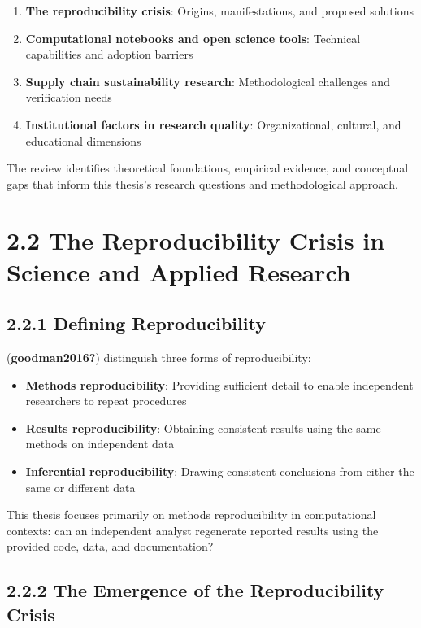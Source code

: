\documentclass[
  oneside,
  open=any]{scrbook}
\providecommand{\tightlist}{%
  \setlength{\itemsep}{0pt}\setlength{\parskip}{0pt}}\usepackage{longtable,booktabs,array}
\begin{document}
\begin{enumerate}
\def\labelenumi{\arabic{enumi}.}
\tightlist
\item
  \textbf{The reproducibility crisis}: Origins, manifestations, and
  proposed solutions
\item
  \textbf{Computational notebooks and open science tools}: Technical
  capabilities and adoption barriers
\item
  \textbf{Supply chain sustainability research}: Methodological
  challenges and verification needs
\item
  \textbf{Institutional factors in research quality}: Organizational,
  cultural, and educational dimensions
\end{enumerate}

The review identifies theoretical foundations, empirical evidence, and
conceptual gaps that inform this thesis's research questions and
methodological approach.

\section{2.2 The Reproducibility Crisis in Science and Applied
Research}\label{the-reproducibility-crisis-in-science-and-applied-research}

\subsection{2.2.1 Defining
Reproducibility}\label{defining-reproducibility}

(\textbf{goodman2016?}) distinguish three forms of reproducibility:

\begin{itemize}
\tightlist
\item
  \textbf{Methods reproducibility}: Providing sufficient detail to
  enable independent researchers to repeat procedures
\item
  \textbf{Results reproducibility}: Obtaining consistent results using
  the same methods on independent data
\item
  \textbf{Inferential reproducibility}: Drawing consistent conclusions
  from either the same or different data
\end{itemize}

This thesis focuses primarily on methods reproducibility in
computational contexts: can an independent analyst regenerate reported
results using the provided code, data, and documentation?

\subsection{2.2.2 The Emergence of the Reproducibility
Crisis}\label{the-emergence-of-the-reproducibility-crisis}
\end{document}
